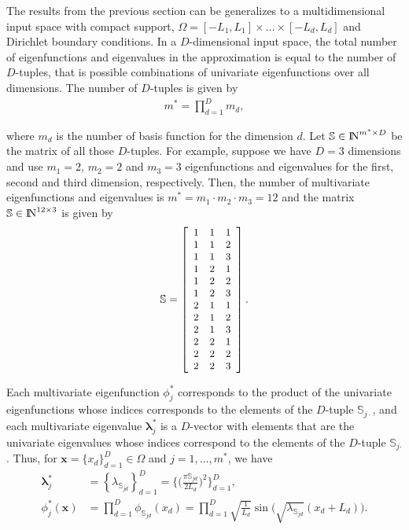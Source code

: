 \documentclass[onecolumn,a4paper,11pt]{article}
\begin{document}
The results from the previous section can be generalizes to a multidimensional input space with compact support, $\Omega=[-L_1,L_1] \times \dots \times [-L_d,L_d]$ and Dirichlet boundary conditions. 
In a $D$-dimensional input space, the total number of eigenfunctions and eigenvalues in the approximation is equal to the number of $D$-tuples, that is possible combinations of univariate eigenfunctions over all dimensions. The number of $D$-tuples is given by 
%
\begin{align} \label{eq_m_multi}
m^{\ast} = \prod_{d=1}^{D} m_d,
\end{align}

\noindent where $m_d$ is the number of basis function for the dimension $d$. Let $\mathbb{S}\in {\rm I\!N}^{m^{\ast} \times D}$ be the matrix of all those $D$-tuples. For example, suppose we have $D=3$ dimensions and use $m_{1}=2$, $m_{2}=2$ and $m_{3}=3$ eigenfunctions and eigenvalues for the first, second and third dimension, respectively. Then, the number of multivariate eigenfunctions and eigenvalues is $m^{\ast} = m_{1} \cdot m_{2} \cdot m_{3} = 12$ and the matrix $\mathbb{S}\in {\rm I\!N}^{12 \times 3}$ is given by
\begin{align}\small
\mathbb{S}=
\left[ {\begin{array}{ccc}
1 & 1 & 1 \nonumber \\
1 & 1 & 2 \\
1 & 1 & 3 \\
1 & 2 & 1 \\
1 & 2 & 2 \\
1 & 2 & 3 \\
2 & 1 & 1 \\
2 & 1 & 2 \\
2 & 1 & 3 \\
2 & 2 & 1 \\
2 & 2 & 2 \\
2 & 2 & 3 
\end{array} } \right].
\end{align} 

Each multivariate eigenfunction $\phi^{\ast}_j$ corresponds to the product of the univariate eigenfunctions whose indices corresponds to the elements of the $D$-tuple $\mathbb{S}_{j\cdotp}$, and each multivariate eigenvalue $\bm{\lambda}^{\ast}_j$ is a $D$-vector with elements that are the univariate eigenvalues whose indices correspond to the elements of the $D$-tuple $\mathbb{S}_{j\bm{\cdotp}}$. Thus, for $\bm{x}=\{x_d\}_{d=1}^D \in \Omega$ and $j=1,\ldots,m^{\ast}$, we have 
%
\begin{align}
\bm{\lambda}^{\ast}_j &= \left\{ \lambda_{\mathbb{S}_{jd}} \right\}_{d=1}^D =  \Big\{ \Big(\frac{\pi \mathbb{S}_{jd}}{2L_d}\Big)^{\!2} \Big\}_{d=1}^D, \label{eq_eigenvalue_multi} \\
%
\phi^{\ast}_j(\bm{x}) &= \prod_{d=1}^{D} \phi_{\mathbb{S}_{jd}}(x_d) = \prod_{d=1}^{D} \sqrt{\frac{1}{L_d}} \sin\!\!\big(\sqrt{\lambda_{\mathbb{S}_{jd}}}(x_d+L_d)\big). \label{eq_eigenfunction_multi}
\end{align}
\end{document}
